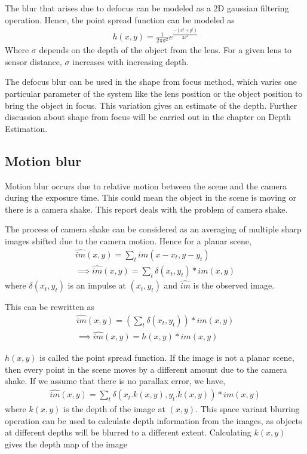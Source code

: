 \documentclass[BTech]{iitmdiss}
\begin{document}
The blur that arises due to defocus can be modeled as a 2D gaussian
filtering operation. Hence, the point spread function can be modeled as
\begin{align*}
h(x,y) = \frac{1}{2\pi\sigma^2}e^\frac{-(x^2+y^2)}{2\sigma^2}
\end{align*}
Where $\sigma$ depends on the depth of the object from the lens. For a 
given lens to sensor distance, $\sigma$ increases with increasing depth.

The defocus blur can be used in the shape from focus method, which 
varies one particular parameter of the system like the lens position or
the object position to bring the object in focus. This variation gives 
an estimate of the depth. Further discussion about shape from focus will
be carried out in the chapter on Depth Estimation.

\subsection{Motion blur}
\label{basic_theory:image_blur:motion}
Motion blur occurs due to relative motion between the scene and the 
camera during the exposure time. This could mean the object in the scene
is moving or there is a camera shake. This report deals with the problem
of camera shake.

The process of camera shake can be considered as an averaging of 
multiple sharp images shifted due to the camera motion. Hence for a 
planar scene, 
\begin{align*}
\hat{im}(x,y) = \sum_tim(x-x_t,y-y_t)\\
\implies\hat{im}(x,y) = \sum_t\delta(x_t, y_t)*im(x,y)
\end{align*}
where $\delta(x_t, y_t)$ is an impulse at $(x_t, y_t)$ and $\hat{im}$ is
the observed image.

This can be rewritten as
\begin{align*}
\hat{im}(x,y) = (\sum_t\delta(x_t, y_t))*im(x,y)\\
\implies \hat{im}(x,y) = h(x,y)*im(x,y)
\end{align*}

$h(x,y)$ is called the point spread function. If the image is not a 
planar scene, then every point in the scene moves by a different amount
due to the camera shake. If we assume that there is no parallax error,
we have,
\begin{align*}
\hat{im}(x,y) = \sum_t\delta(x_t.k(x,y), y_t.k(x,y))*im(x,y)
\end{align*}
where $k(x,y)$ is the depth of the image at $(x,y)$. This space variant
blurring operation can be used to calculate depth information from the 
images, as objects at different depths will be blurred to a different
extent. Calculating $k(x,y)$ gives the depth map of the image
\end{document}
